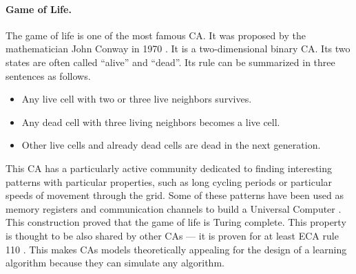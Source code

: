 \paragraph{Game of Life.\label{sec:game-life}}
The game of life is one of the most famous \ac{CA}. It was proposed by the
mathematician John Conway in 1970 \parencite{gardnerMathematicalGames1970}. It
is a two-dimensional binary \ac{CA}. Its two states are often called ``alive''
and ``dead''. Its rule can be summarized in three sentences as follows.
\begin{itemize}
  \item Any live cell with two or three live neighbors survives.
  \item Any dead cell with three living neighbors becomes a live cell.
  \item Other live cells and already dead cells are dead in the next generation.
\end{itemize}
This \ac{CA} has a particularly active community dedicated to finding
interesting patterns with particular properties, such as long cycling periods or
particular speeds of movement through the grid. Some of these patterns have been
used as memory registers and communication channels to build a Universal
Computer \parencite{IgblanLifeUniversal}. This construction proved that the game
of life is Turing complete. This property is thought to be also shared by other
\acp{CA} --- it is proven for at least \ac{ECA} rule 110
\parencite{cookUniversalityElementaryCellular2004}. This makes \acp{CA}
models theoretically appealing for the design of a learning algorithm because
they can simulate any algorithm.


